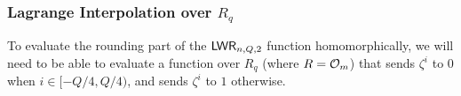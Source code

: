 \subsubsection{Lagrange Interpolation over
  $R_q$}\label{sec:lagr-interp-over}

To evaluate the rounding part of the $\mathsf{LWR}_{n,Q,2}$ function homomorphically,
we will need to be able to evaluate a function over $R_q$ (where $R=\mathcal{O}_{m}$) that sends $\zeta^i$ to
$0$ when $i \in [-Q/4,Q/4)$, and sends $\zeta^i$ to $1$ otherwise.    






